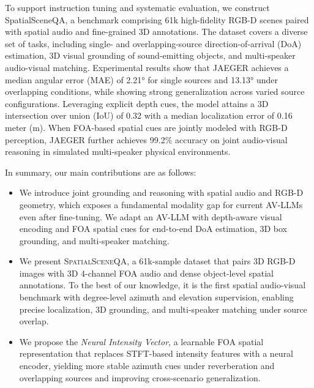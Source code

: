 To support instruction tuning and systematic evaluation, we construct SpatialSceneQA, a benchmark comprising 61k high-fidelity RGB-D scenes paired with spatial audio and fine-grained 3D annotations. The dataset covers a diverse set of tasks, including single- and overlapping-source direction-of-arrival (DoA) estimation, 3D visual grounding of sound-emitting objects, and multi-speaker audio-visual matching. Experimental results show that JAEGER achieves a median angular error (MAE) of 2.21° for single sources and 13.13° under overlapping conditions, while showing strong generalization across varied source configurations. Leveraging explicit depth cues, the model attains a 3D intersection over union (IoU) of 0.32 with a median localization error of 0.16 meter (m). When FOA-based spatial cues are jointly modeled with RGB-D perception, JAEGER further achieves 99.2\% accuracy on joint audio-visual reasoning in simulated multi-speaker physical environments.

In summary, our main contributions are as follows:
\vspace{-0.2cm}
\begin{itemize}[leftmargin=*]
    \setlength\itemsep{-0.3em}
    
    \item We introduce joint grounding and reasoning with spatial audio and RGB-D geometry, which exposes a fundamental modality gap for current AV-LLMs even after fine-tuning. We adapt an AV-LLM with depth-aware visual encoding and FOA spatial cues for end-to-end DoA estimation, 3D box grounding, and multi-speaker matching.
    \item We present \textsc{SpatialSceneQA}, a 61k-sample dataset that pairs 3D RGB-D images with 3D 4-channel FOA audio and dense object-level spatial annotations. To the best of our knowledge, it is the first spatial audio-visual benchmark with degree-level azimuth and elevation supervision, enabling precise localization, 3D grounding, and multi-speaker matching under source overlap.
    \item We propose the \textit{Neural Intensity Vector}, a learnable FOA spatial representation that replaces STFT-based intensity features with a neural encoder, yielding more stable azimuth cues under reverberation and overlapping sources and improving cross-scenario generalization.
\end{itemize}
